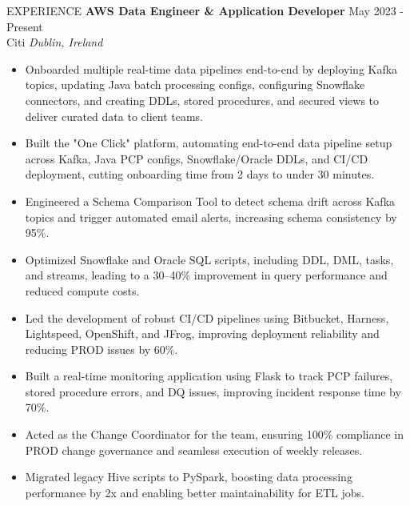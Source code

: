 \documentclass{resume} %
\begin{document}
\begin{rSection}{EXPERIENCE}
\textbf{AWS Data Engineer \& Application Developer} \hfill May 2023 - Present\\
    Citi \hfill \textit{Dublin, Ireland} 
\begin{itemize}
    \itemsep -3pt {} 
    \item Onboarded multiple real-time data pipelines end-to-end by deploying Kafka topics, updating Java batch processing configs, configuring Snowflake connectors, and creating DDLs, stored procedures, and secured views to deliver curated data to client teams.
    \item Built the "One Click" platform, automating end-to-end data pipeline setup across Kafka, Java PCP configs, Snowflake/Oracle DDLs, and CI/CD deployment, cutting onboarding time from 2 days to under 30 minutes.
    \item Engineered a Schema Comparison Tool to detect schema drift across Kafka topics and trigger automated email alerts, increasing schema consistency by 95\%.
    \item Optimized Snowflake and Oracle SQL scripts, including DDL, DML, tasks, and streams, leading to a 30--40\% improvement in query performance and reduced compute costs.
    \item Led the development of robust CI/CD pipelines using Bitbucket, Harness, Lightspeed, OpenShift, and JFrog, improving deployment reliability and reducing PROD issues by 60\%.
    \item Built a real-time monitoring application using Flask to track PCP failures, stored procedure errors, and DQ issues, improving incident response time by 70\%.
    \item Acted as the Change Coordinator for the team, ensuring 100\% compliance in PROD change governance and seamless execution of weekly releases.
    \item Migrated legacy Hive scripts to PySpark, boosting data processing performance by 2x and enabling better maintainability for ETL jobs.
\end{itemize}


\end{rSection}
\end{document}
